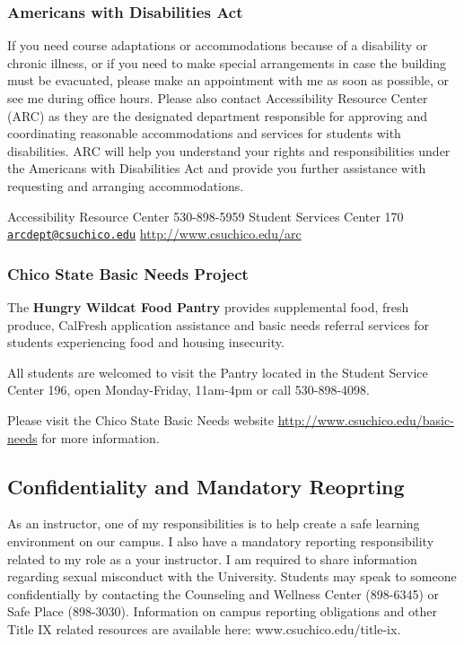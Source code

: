 \documentclass[
  11pt,
]{article}
\begin{document}
\hypertarget{americans-with-disabilities-act}{%
\subsubsection{Americans with Disabilities
Act}\label{americans-with-disabilities-act}}

If you need course adaptations or accommodations because of a disability
or chronic illness, or if you need to make special arrangements in case
the building must be evacuated, please make an appointment with me as
soon as possible, or see me during office hours. Please also contact
Accessibility Resource Center (ARC) as they are the designated
department responsible for approving and coordinating reasonable
accommodations and services for students with disabilities. ARC will
help you understand your rights and responsibilities under the Americans
with Disabilities Act and provide you further assistance with requesting
and arranging accommodations.

Accessibility Resource Center 530-898-5959 Student Services Center 170
\href{mailto:arcdept@csuchico.edu}{\nolinkurl{arcdept@csuchico.edu}}
\url{http://www.csuchico.edu/arc}

\hypertarget{chico-state-basic-needs-project}{%
\subsubsection{Chico State Basic Needs
Project}\label{chico-state-basic-needs-project}}

The \textbf{Hungry Wildcat Food Pantry} provides supplemental food,
fresh produce, CalFresh application assistance and basic needs referral
services for students experiencing food and housing insecurity.

All students are welcomed to visit the Pantry located in the Student
Service Center 196, open Monday-Friday, 11am-4pm or call 530-898-4098.

Please visit the Chico State Basic Needs website
\url{http://www.csuchico.edu/basic-needs} for more information.

\hypertarget{confidentiality-and-mandatory-reoprting}{%
\subsection{Confidentiality and Mandatory
Reoprting}\label{confidentiality-and-mandatory-reoprting}}

As an instructor, one of my responsibilities is to help create a safe
learning environment on our campus. I also have a mandatory reporting
responsibility related to my role as a your instructor. I am required to
share information regarding sexual misconduct with the University.
Students may speak to someone confidentially by contacting the
Counseling and Wellness Center (898-6345) or Safe Place (898-3030).
Information on campus reporting obligations and other Title IX related
resources are available here: www.csuchico.edu/title-ix.
\end{document}
